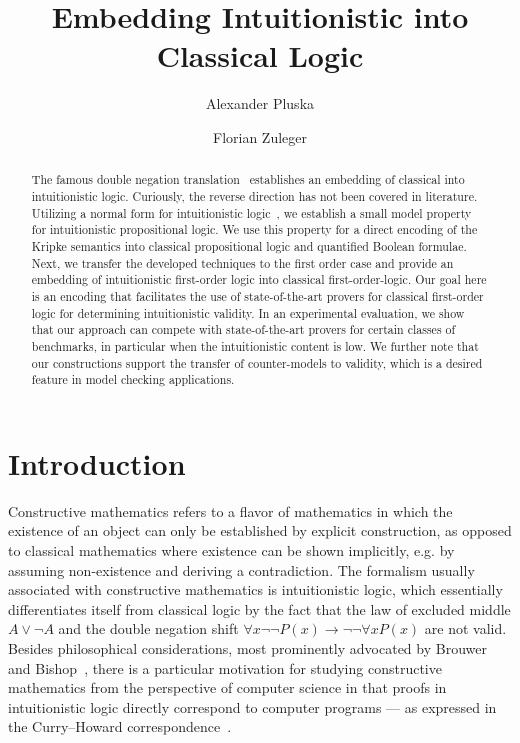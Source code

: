 \documentclass{easychair}
\theoremstyle{definition}
\theoremstyle{definition}
\theoremstyle{definition}
\theoremstyle{definition}
\theoremstyle{definition}
\theoremstyle{definition}
\theoremstyle{definition}
\begin{document}
	\title{Embedding Intuitionistic into Classical Logic}
	\author{Alexander Pluska \and Florian Zuleger}
	\maketitle
\begin{abstract}
The famous double negation translation~\cite{glivenko1929quelques,godel1933intuitionistischen} establishes an embedding of classical into intuitionistic logic.
Curiously, the reverse direction has not been covered in literature.
Utilizing a normal form for intuitionistic logic~\cite{claessen2015sat}, we establish a small model property for intuitionistic propositional logic.
We use this property for a direct encoding of the Kripke semantics into classical propositional logic and quantified Boolean formulae.
Next, we transfer the developed techniques to the first order case and provide an embedding of intuitionistic first-order logic into classical first-order-logic.
Our goal here is an encoding that facilitates the use of state-of-the-art provers for classical first-order logic for determining intuitionistic validity.
In an experimental evaluation, we show that our approach can compete with state-of-the-art provers for certain classes of benchmarks, in particular when the intuitionistic content is low.
We further note that our constructions support the transfer of counter-models to validity, which is a desired feature in model checking applications.
\end{abstract}

\section{Introduction}

Constructive mathematics refers to a flavor of mathematics in which the existence of an object can only be established by explicit construction, as opposed to classical mathematics where existence can be shown implicitly, e.g. by assuming non-existence and deriving a contradiction.
The formalism usually associated with constructive mathematics is intuitionistic logic, which essentially differentiates itself from classical logic by the fact that the law of excluded middle $A\vee\neg A$ and the double negation shift $\forall x\neg\neg P(x)\to\neg\neg\forall xP(x)$ are not valid.
Besides philosophical considerations, most prominently advocated by Brouwer~\cite{brouwer1907over} and Bishop~\cite{bishop1967foundations}, there is a particular motivation for studying constructive mathematics from the perspective of computer science in that proofs in intuitionistic logic directly correspond to computer programs --- as expressed in the Curry--Howard correspondence~\cite{howard1980formulae}.
\end{document}
